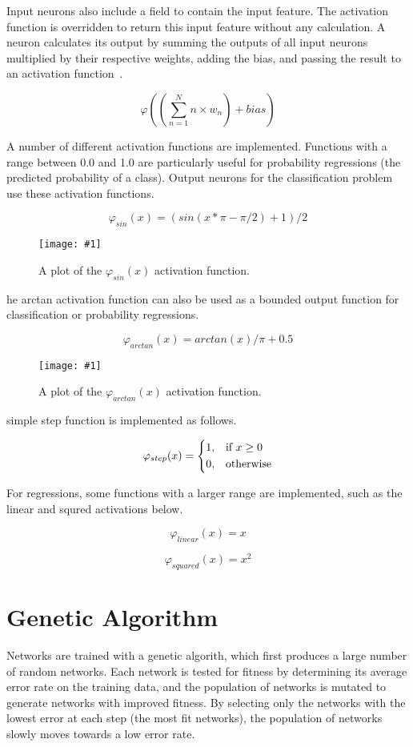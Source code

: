 \documentclass[twocolumn]{article}
\newcommand\fig[5]{
	\begin{figure}[H]
		\begin{center}\texttt{[image: \#1]}\end{center}
		\caption{#4}\label{fig:#2}
	\end{figure}
}
\begin{document}
Input neurons also include a field to contain the input feature. The activation function is overridden to return this input feature without any calculation. A neuron calculates its output by summing the outputs of all input neurons multiplied by their respective weights, adding the bias, and passing the result to an activation function~\cite{Russell:2003:AIM:773294}. 

$$\varphi((\sum_{n=1}^{N}n \times w_n)+bias)$$

A number of different activation functions are implemented. Functions with a range between 0.0 and 1.0 are particularly useful for probability regressions (the predicted probability of a class). Output neurons for the classification problem use these activation functions. 

$$\varphi_{sin}(x) = (sin(x*\pi-\pi/2)+1)/2$$

\fig{images/sin.png}{sinact}{0.5}{
A plot of the $\varphi_{sin}(x)$ activation function.
}

The arctan activation function can also be used as a bounded output function for classification or probability regressions.

$$\varphi_{arctan}(x) = arctan(x)/\pi+0.5$$

\fig{images/tan.png}{tanact}{0.5}{
A plot of the $\varphi_{arctan}(x)$ activation function.
}

A simple step function is implemented as follows.

\[
\varphi_{step}(x) =  
\begin{dcases}
    1,& \text{if } x\geq 0\\
    0,              & \text{otherwise}
\end{dcases}
\]

For regressions, some functions with a larger range are implemented, such as the linear and squred activations below.

$$\varphi_{linear}(x) = x$$

$$\varphi_{squared}(x) = x^2$$

\section{Genetic Algorithm}
Networks are trained with a genetic algorith, which first produces a large number of random networks. Each network is tested for fitness by determining its average error rate on the training data, and the population of networks is mutated to generate networks with improved fitness. By selecting only the networks with the lowest error at each step (the most fit networks), the population of networks slowly moves towards a low error rate.
\end{document}
